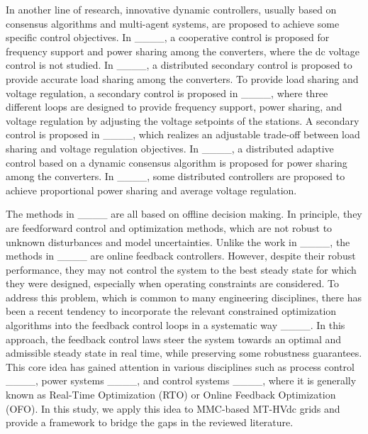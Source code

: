 In another line of research, innovative dynamic controllers, usually based on consensus algorithms and multi-agent systems, are proposed to achieve some specific control objectives.
In ____, a cooperative control is proposed for frequency support and power sharing among the converters, where the dc voltage control is not studied.
In ____, a distributed secondary control is proposed to provide accurate load sharing among the converters.
To provide load sharing and voltage regulation, a secondary control is proposed in ____, where three different loops are designed to provide frequency support, power sharing, and voltage regulation by adjusting the voltage setpoints of the stations. 
A secondary control is proposed in ____, which realizes an adjustable trade-off between load sharing and voltage regulation objectives.
In ____, a distributed adaptive control based on a dynamic consensus algorithm is proposed for power sharing among the converters.
In ____, some distributed controllers are proposed to achieve proportional power sharing and average voltage regulation.

The methods in ____ are all based on offline decision making. In principle, they are feedforward control and optimization methods, which are not robust to unknown disturbances and model uncertainties.
Unlike the work in ____, the methods in ____ are online feedback controllers.
However, despite their robust performance, they may not control the system to the best steady state for which they were designed, especially when operating constraints are considered.
To address this problem, which is common to many engineering disciplines, there has been a recent tendency to incorporate the relevant constrained optimization algorithms into the feedback control loops in a systematic way ____.
In this approach, the feedback control laws steer the system towards an optimal and admissible steady state in real time, while preserving some robustness guarantees.
This core idea has gained attention in various disciplines such as process control ____, power systems ____, and control systems ____, where it is generally known as Real-Time Optimization (RTO) or Online Feedback Optimization (OFO).
In this study, we apply this idea to MMC-based MT-HVdc grids and provide a framework to bridge the gaps in the reviewed literature.